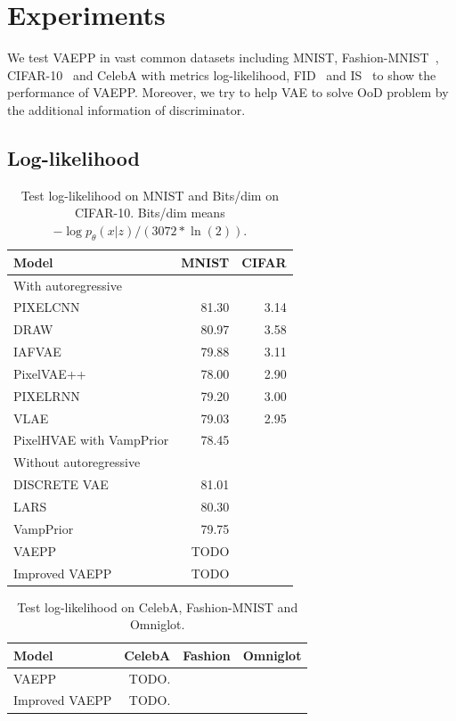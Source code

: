\section{Experiments}
We test VAEPP in vast common datasets including MNIST, Fashion-MNIST~\cite{xiao2017/online}, CIFAR-10~\cite{krizhevsky2009learning} and CelebA with metrics log-likelihood, FID~\cite{heusel2017gans} and IS~\cite{salimans2016improved} to show the performance of VAEPP. Moreover, we try to help VAE to solve OoD problem by the additional information of discriminator. 
\subsection{Log-likelihood}
\begin{table}[tb]
\centering
\begin{tabular}{lrr}  
\toprule
Model  &  MNIST & CIFAR\\
\midrule
With autoregressive   \\
PIXELCNN         &  81.30  &  3.14   \\
DRAW             &  80.97  &  3.58    \\
IAFVAE           &  79.88  &  3.11    \\
PixelVAE++       &  78.00  &  2.90   \\
PIXELRNN         &  79.20  &  3.00    \\
VLAE             &  79.03  &  2.95     \\
PixelHVAE with VampPrior &  78.45  &     \\
\midrule
Without autoregressive   \\
DISCRETE VAE     &  81.01      \\
LARS             &  80.30     \\
VampPrior        &  79.75      \\
VAEPP            &  TODO      \\
Improved VAEPP   &  TODO      \\
\bottomrule
\end{tabular}
\caption{Test log-likelihood on MNIST and Bits/dim on CIFAR-10. Bits/dim means $-\log p_\theta(x|z) / (3072 * \ln(2))$.}
\label{tab:mnist-nll}
\end{table}
\begin{table}[tb]
\centering
\begin{tabular}{lrrr}  
\toprule
Model  &  CelebA & Fashion & Omniglot \\
\midrule
VAEPP           &  TODO.     \\
Improved VAEPP   &  TODO.     \\
\bottomrule
\end{tabular}
\caption{Test log-likelihood on CelebA, Fashion-MNIST and Omniglot. }
\label{tab:cifar-nll}
\end{table}
